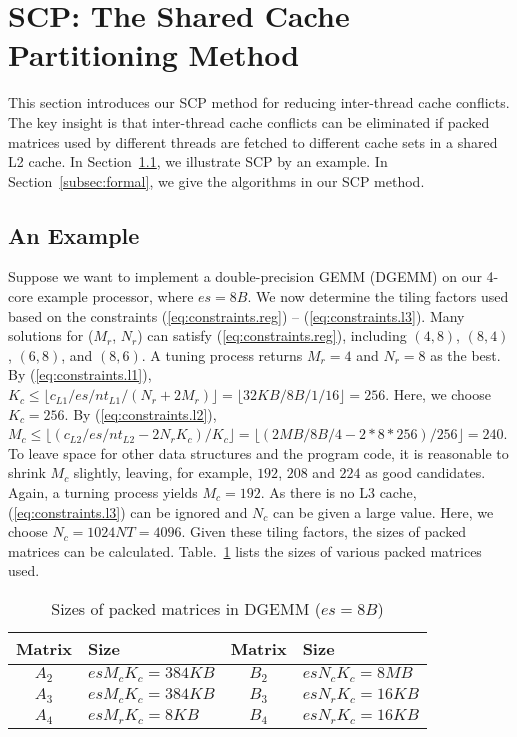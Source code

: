 \section{SCP: The Shared Cache Partitioning Method}\label{sec:scp}

This section introduces our SCP method for reducing
inter-thread cache conflicts.
The key insight is that inter-thread cache conflicts can be eliminated
if packed matrices used by different threads are fetched to different cache sets in a shared L2 cache.
In Section~\ref{subsec:example}, we illustrate 
SCP by an example.  In Section~\ref{subsec:formal},
we give the algorithms in our SCP method.

\subsection{An Example}\label{subsec:example}


Suppose we want to implement a double-precision GEMM (DGEMM) on
our 4-core example processor, where $es=8B$.
We now determine the tiling factors used based on
the constraints (\ref{eq:constraints.reg}) -- (\ref{eq:constraints.l3}).
Many solutions for ($M_r$, $N_r$) can satisfy (\ref{eq:constraints.reg}), including
$(4,8)$, $(8,4)$, $(6,8)$, and $(8,6)$.
A tuning process returns $M_r = 4$ and $N_r = 8$ as the best.
By (\ref{eq:constraints.l1}),
$K_c \le \lfloor c_{L1}/es/nt_{L1}/(N_r + 2 M_r) \rfloor = \lfloor 32KB/8B/1/16 \rfloor = 256$.
Here, we choose $K_c=256$.
By (\ref{eq:constraints.l2}),
$M_c \le \lfloor (c_{L2}/es/nt_{L2} - 2 N_r K_c )/ K_c \rfloor =
\lfloor (2MB/8B/4 - 2*8*256)/256 \rfloor = 240$.
To leave space for other data structures and the program code,
it is reasonable to shrink $M_c$ slightly, leaving,
for example, $192$, $208$ and $224$ as good
candidates. Again, a turning process yields
$M_c = 192$.
As there is no L3 cache, (\ref{eq:constraints.l3}) can be ignored
and $N_c$ can be given a large value.
Here, we choose $N_c = 1024NT = 4096$.
Given these tiling factors, the sizes of packed matrices
can be calculated. Table.~\ref{tab:msizes} lists
the sizes of various packed matrices used.

\begin{table}
  \centering
  \caption{Sizes of packed matrices in DGEMM ($es = 8B$)}
  \label{tab:msizes}
  \begin{tabular}{cl|cl}
    \toprule
    Matrix & Size & Matrix & Size \\
    \midrule
    $A_2$ & $es M_c K_c = 384KB$ & $B_2$ & $es N_c K_c = 8MB$ \\
    $A_3$ & $es M_c K_c = 384KB$ & $B_3$ & $es N_r K_c = 16KB$ \\
    $A_4$ & $es M_r K_c = 8KB$   & $B_4$ & $es N_r K_c = 16KB$ \\
    \bottomrule
  \end{tabular}
\end{table}

